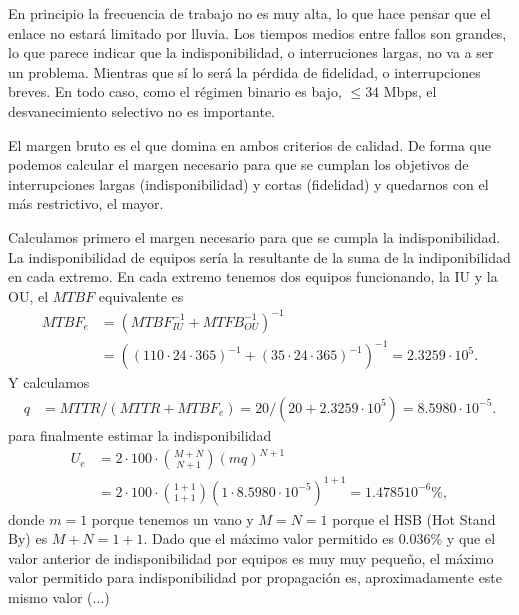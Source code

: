  \begin{solnum}
 \item 
En principio la frecuencia de trabajo no es muy alta, lo que hace pensar que el enlace no estará limitado por lluvia. Los tiempos medios entre fallos son grandes, lo que parece indicar que la indisponibilidad, o interruciones largas, no va a ser un problema. Mientras que sí lo será la pérdida de fidelidad, o interrupciones breves. En todo caso, como el régimen binario es bajo, $\leq 34$ Mbps, el desvanecimiento selectivo no es importante. 

El margen bruto es el que domina en ambos criterios de calidad. De forma que podemos calcular el margen necesario para que se cumplan los objetivos de interrupciones largas (indisponibilidad) y cortas (fidelidad) y quedarnos con el más restrictivo, el mayor.

Calculamos primero el margen necesario para que se cumpla la indisponibilidad. La indisponibilidad de equipos sería la resultante de la suma de la indiponibilidad en cada extremo. En cada extremo tenemos dos equipos funcionando, la IU y la OU, el $MTBF$ equivalente es
\begin{align}
MTBF_e&=(MTBF_{IU}^{-1}+MTFB_{OU}^{-1})^{-1}\nonumber\\
    &=((110\cdot24\cdot 365)^{-1}+(35\cdot24\cdot365)^{-1})^{-1}=2.3259\cdot 10^5.
\end{align}
 Y calculamos
\begin{align}
q&=MTTR/(MTTR+MTBF_e)=20/(20+2.3259\cdot 10^5)=8.5980\cdot 10^{-5}.
\end{align}
 para finalmente estimar la indisponibilidad
\begin{align}
U_{e}&=2 \cdot 100\cdot \binom{M+N}{N+1} (mq)^{N+1}\nonumber\\&=2\cdot 100 \cdot\binom{1+1}{1+1} (1\cdot 8.5980\cdot 10^{-5})^{1+1}
=1.478510^{-6}\%,
\end{align}
donde $m=1$ porque tenemos un vano y  $M=N=1$ porque el HSB (Hot Stand By) es $M+N=1+1$. Dado que el máximo valor permitido es $0.036\%$ y que el valor anterior de indisponibilidad por equipos es muy muy pequeño, el máximo valor permitido para indisponibilidad por propagación es, aproximadamente este mismo valor (...)\end{solnum}





